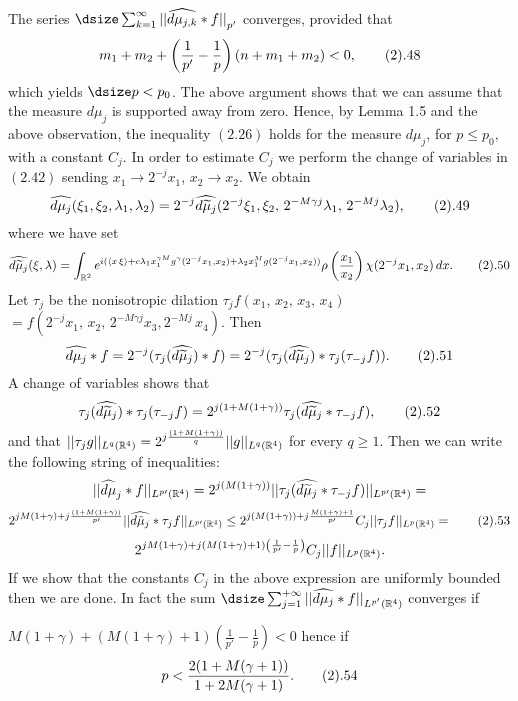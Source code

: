 The series $\dsize
\sum_{k=1}^{\infty}{||{\widehat{d\mu_{j,k}}*f}||}_{p'}$ converges,  
provided that 
$$m_1+ m_2 +
\left(\frac{1}{p'}-\frac{1}{p}\right) (n+m_1+ m_2)<0,
\tag 2.48
$$
which  yields
$\dsize p<p_0$. 
The above argument shows  that we can assume that the measure $d\mu_j$ 
is supported away from zero. Hence,
by Lemma 1.5  and  the above observation, the inequality $(2.26)$ 
holds for the measure $d\mu_j$, for   $p\leq p_0$, 
with a constant $C_j$.
In order to estimate $C_j$ 
we perform the change of variables in  $(2.42)$ sending 
$x_1\to 2^{-j}x_1$, $x_2\to x_2$. We  obtain 
$$
\widehat{d\mu_j}(\xi_1,\xi_2,\lambda_1,\lambda_2)= 2^{-j}
\widehat{d\widetilde \mu_j}( 2^{-j}\xi_1, \xi_2,\,
2^{-M\gamma j}\lambda_1,\, 2^{-Mj }\lambda_2),
\tag 2.49
$$
where we have set 
$$
\widehat{d\widetilde\mu_j}
(\xi,\lambda)=
\int_{{\Bbb R}^2} e^{i(
\langle x\,\xi\rangle+c\lambda_1x_1^{\gamma M }
g^\gamma(2^{-j}x_1, x_2)+\lambda_2x_1^{M}g (2^{-j}x_1, x_2))}
\rho\left(\frac{x_1}{x_2}\right)\chi(2^{-j}x_1, x_2)  \,dx.
\tag 2.50
$$
Let $\tau_{j}$ be the nonisotropic dilation 
$\tau_{j}f(x_1,\,x_2,\,x_3,\,x_4)$ 
$ = f(2^{-j}x_1, \,x_2,\,2^{-M\gamma j}x_3,2^{-M j}\,x_4)$.
Then 
$$
\widehat{d\mu_j}*f = 2^{-j}(\tau_{j}(\widehat{d\widetilde\mu_j})*f)
  = 2^{-j}(\tau_{j}(\widehat{d\widetilde\mu_j})*\tau_{j}(\tau_{-j}f)).
\tag 2.51
$$
A change of variables shows that 
$$
\tau_{j}(\widehat{d\widetilde\mu_j})*\tau_{j}(\tau_{-j}f)  =
 2^{j(1+M(1+\gamma))}
\tau_{j}(\widehat{d\widetilde\mu_j}* \tau_{-j}f),
\tag 2.52
$$
and that
$||\tau_{j}g||_{L^{q}({\Bbb R}^4)} =
2^{j\frac{(1+M(1+\gamma))}{q}} ||g||_{L^{q}({\Bbb R}^4)}$ for every $q\ge 1$. 
Then we can write the following string of inequalities:
$$|| \widehat{d\mu}_j *f||_{L^{p\prime}({\Bbb R}^4)} = 2^{j(M(1+\gamma))}||\tau_{j}(\widehat{d\widetilde\mu_j}* \tau_{-j}f)||_{L^{p\prime}({\Bbb R}^4)}
=$$
$$
2^{jM(1+\gamma) +j\frac{(1+ M(1+\gamma))}{p\prime}}
|| \widehat{d\tilde\mu_j}* \tau_{j}f||_{L^{p\prime}({\Bbb R}^4)}\leq
2^{j(M(1+\gamma)) +j\frac{M(1+\gamma)+1}{p\prime} }
C_{j}||\tau_{j}f||_{L^{p}({\Bbb R}^4)} =
\tag 2.53
$$
$$
2^{jM(1+\gamma) +j(M(1+\gamma)+1)\left(\frac{1}{p\prime}-\frac{1}{p}\right)}
C_{j}||f||_{L^{p}({\Bbb R}^4)}.
$$
If we show that the constants $C_{j}$ in the above expression are uniformly 
bounded then we are done. In fact the sum $\dsize 
\sum_{j=1}^{+\infty}||\widehat{d\mu_j}*f||_{L^{p'}({\Bbb R}^4)}$
converges if 
\par\noindent
$
M(1+\gamma) +(M(1+\gamma)+1)\left(\frac{1}{p\prime}-\frac{1}{p}\right) 
<0$
hence if
$$
p <\frac{2(1+M(\gamma+1))}{1+2M(\gamma+1)}.
\tag 2.54
$$ 
